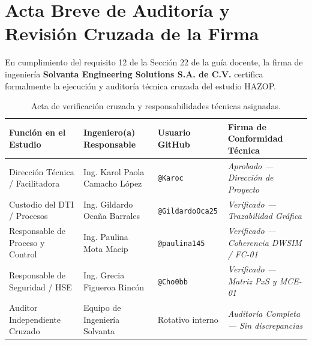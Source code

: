 \documentclass[10pt,letterpaper]{article}
\begin{document}
\section{Acta Breve de Auditoría y Revisión Cruzada de la Firma}
En cumplimiento del requisito 12 de la Sección 22 de la guía docente, la firma de ingeniería \textbf{Solvanta Engineering Solutions S.A. de C.V.} certifica formalmente la ejecución y auditoría técnica cruzada del estudio HAZOP.

\begin{table}[H]
\centering\small
\caption{Acta de verificación cruzada y responsabilidades técnicas asignadas.} \label{tab:acta_firmas}
\begin{tabularx}{\textwidth}{p{3.8cm} p{4.2cm} p{2.8cm} >{\raggedright\arraybackslash}X}
\toprule
\textbf{Función en el Estudio} & \textbf{Ingeniero(a) Responsable} & \textbf{Usuario GitHub} & \textbf{Firma de Conformidad Técnica} \\
\midrule
Dirección Técnica / Facilitadora & Ing. Karol Paola Camacho López & \texttt{@Karoc} & \textit{Aprobado --- Dirección de Proyecto} \\
Custodio del DTI / Procesos & Ing. Gildardo Ocaña Barrales & \texttt{@GildardoOca25} & \textit{Verificado --- Trazabilidad Gráfica} \\
Responsable de Proceso y Control & Ing. Paulina Mota Macip & \texttt{@paulina145} & \textit{Verificado --- Coherencia DWSIM / FC-01} \\
Responsable de Seguridad / HSE & Ing. Grecia Figueroa Rincón & \texttt{@Cho0bb} & \textit{Verificado --- Matriz PxS y MCE-01} \\
Auditor Independiente Cruzado & Equipo de Ingeniería Solvanta & Rotativo interno & \textit{Auditoría Completa --- Sin discrepancias} \\
\bottomrule
\end{tabularx}
\end{table}
\newpage
\end{document}

